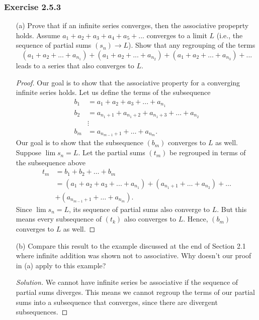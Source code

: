 \subsubsection{Exercise 2.5.3}
\begin{enumerate}
    \item[(a)] Prove that if an infinite series converges, then the associative propeprty holds. Assume \(a_1 + a_2 + a_3 + a_4 + a_5 + ...\) converges to a limit \(L \) (i.e., the sequence of partial sums \((s_n) \to L \)). Show that any regrouping of the terms 
        \[ (a_1 + a_2 + ... + a_{n_1}) + (a_1 + a_2 + ... + a_{n_2}) + (a_1 + a_2 + ... + a_{n_3}) + ...\]
        leads to a series that also converges to \(L\).
\begin{proof}
Our goal is to show that the associative property for a converging infinite series holds. Let us define the terms of the subsequence 
\begin{align*}
    b_1 &= a_1 + a_2 + a_3 + ... + a_{n_1} \\
    b_2 &= a_{n_1 + 1}  + a_{n_1 + 2} + a_{n_1 + 3} + \dots + a_{n_2} \\
        &\vdots  \\
    b_m &= a_{n_{m-1}+1} + \dots + a_{n_m}.
\end{align*}
Our goal is to show that the subsequence \((b_m)\) converges to \(L \) as well. Suppose \( \lim s_n = L \). Let the partial sums \( (t_m)\) be regrouped in terms of the subsequence above
\begin{align*}
    t_m&= b_1 + b_2 + \dots + b_m \\
       &= (a_1 + a_2 + a_3 + ... + a_{n_1}) + (a_{n_1 + 1} + \dots + a_{n_2}) + \dots \\
       &+ ( a_{n_{m-1}+1} + \dots + a_{n_m}).
\end{align*}
Since \( \lim s_n = L \), its sequence of partial sums also converge to \(L\). But this means every subsequence of \( (t_k)\) also converges to \(L \). Hence, \((b_m)\) converges to \(L \) as well.
\end{proof}
\item[(b)] Compare this result to the example discussed at the end of Section 2.1 where infinite addition was shown not to associative. Why doesn't our proof in (a) apply to this example?
    \begin{proof}[Solution]
    We cannot have infinite series be associative if the sequence of partial sums diverges. This means we cannot regroup the terms of our partial sums into a subsequence that converges, since there are divergent subsequences. 
    \end{proof}
\end{enumerate}

